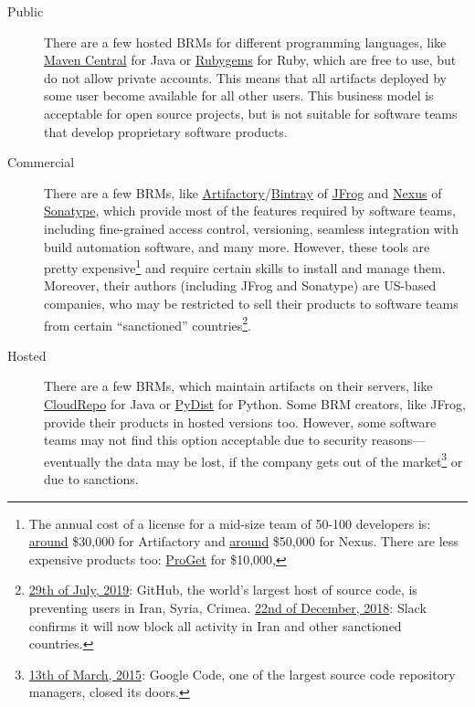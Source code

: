 \documentclass[12pt,oneside]{article}
\begin{document}
\begin{description}
  \item[Public]
  There are a few hosted BRMs for different programming languages, like
  \href{https://search.maven.org/}{Maven Central} for Java or
  \href{https://www.rubygems.org}{Rubygems} for Ruby, which are free to use,
  but do not allow private accounts. This means that all artifacts deployed
  by some user become available for all other users. This business model is
  acceptable for open source projects, but is not suitable for software teams
  that develop proprietary software products.

  \item[Commercial]
  There are a few BRMs, like
  \href{https://jfrog.com/artifactory/}{Artifactory}/\href{https://jfrog.com/bintray/}{Bintray}
  of \href{https://jfrog.com}{JFrog}
  and \href{https://www.sonatype.com/nexus-repository-oss}{Nexus}
  of \href{https://www.sonatype.com/}{Sonatype},
  which provide most of the features required by software teams, including
  fine-grained access control, versioning, seamless integration with build
  automation software, and many more. However, these tools are pretty expensive\footnote{%
    The annual cost of a license for a mid-size team of 50-100 developers is:
    \href{https://jfrog.com/pricing/}{around} \$30,000 for Artifactory
    and
    \href{https://www.sonatype.com/product-pricing}{around} \$50,000 for Nexus.
    There are less expensive products too:
    \href{https://inedo.com/proget/pricing}{ProGet} for \$10,000,
  }
  and require certain skills to install and manage them. Moreover, their
  authors (including JFrog and Sonatype) are US-based companies, who may be
  restricted to sell their products to software teams from certain ``sanctioned'' countries\footnote{%
    \href{https://techcrunch.com/2019/07/29/github-ban-sanctioned-countries/}{29th of July, 2019}:
    GitHub, the world's largest host of source code, is preventing users in Iran, Syria, Crimea.
    \href{https://techcrunch.com/2018/12/22/slack-says-it-will-comply-with-sanctions/}{22nd of December, 2018}:
    Slack confirms it will now block all activity in Iran and other sanctioned countries.
  }.

  \item[Hosted]
  There are a few BRMs, which maintain artifacts on their servers,
  like \href{https://www.cloudrepo.io/pricing.html}{CloudRepo} for Java
  or \href{https://pydist.com/}{PyDist} for Python.
  Some BRM creators, like JFrog, provide their products in hosted versions too.
  However, some software teams may not find this option acceptable
  due to security reasons---eventually the data may be lost, if the company
  gets out of the market\footnote{%
    \href{https://www.theverge.com/2015/3/13/8206903/google-code-is-closing-down-github-bitbucket}{13th of March, 2015}:
    Google Code, one of the largest source code repository managers, closed its doors.
  }
  or due to sanctions.


\end{description}
\end{document}
